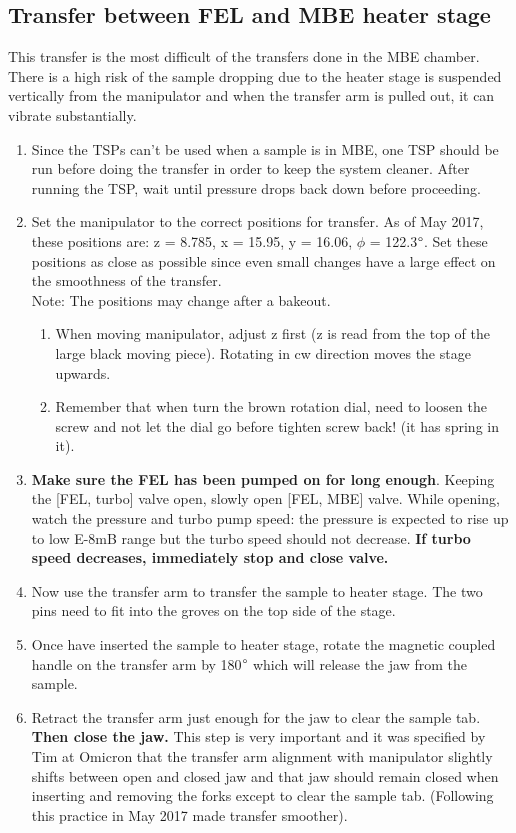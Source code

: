 \subsection{Transfer between FEL and MBE heater stage}
This transfer is the most difficult of the transfers done in the MBE chamber. There is a high risk of the sample dropping due to the heater stage is suspended vertically from the manipulator and when the transfer arm is pulled out, it can vibrate substantially.

\begin{enumerate}
	\item Since the TSPs can't be used when a sample is in MBE, one TSP should be run before doing the transfer in order to keep the system cleaner. After running the TSP, wait until pressure drops back down before proceeding.
	\item   Set the manipulator to the correct positions for transfer. As of May 2017, these positions are: z = 8.785, x = 15.95, y = 16.06, $\phi$ = 122.3$\degree$. Set these positions as close as possible since even small changes have a large effect on the smoothness of the transfer.\\
	Note: The positions may change after a bakeout.
		\begin{enumerate}
			\item	When moving manipulator, adjust z first (z is read from the top of the large black moving piece).  Rotating in cw direction moves the stage upwards.
			\item	Remember that when turn the brown rotation dial, need to loosen the screw and not let the dial go before tighten screw back! (it has spring in it). 
		\end{enumerate}
	\item \textbf{Make sure the FEL has been pumped on for long enough}. Keeping the [FEL, turbo] valve open, slowly open [FEL, MBE] valve. While opening, watch the pressure and turbo pump speed: the pressure is expected to rise up to low E-8mB range but the turbo speed should not decrease. \textbf {If turbo speed decreases, immediately stop and close valve.}
	\item Now use the transfer arm to transfer the sample to heater stage. The two pins need to fit into the groves on the top side of the stage. 
	\item Once have inserted the sample to heater stage, rotate the magnetic coupled handle on the transfer arm by 180$\degree$ which will release the jaw from the sample. 
	\item Retract the transfer arm just enough for the jaw to clear the sample tab. \textbf{Then close the jaw.} This step is very important and it was specified by Tim at Omicron that the transfer arm alignment with manipulator slightly shifts between open and closed jaw and that jaw should remain closed when inserting and removing the forks except to clear the sample tab. (Following this practice in May 2017 made transfer smoother). 

\end{enumerate}
